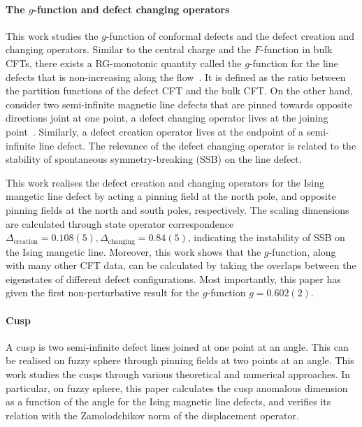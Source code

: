 \documentclass{timesjhep}
\begin{document}
\paragraph{The $g$-function and defect changing operators~\cite{Zhou2024Jan}}

This work studies the $g$-function of conformal defects and the defect creation and changing operators. Similar to the central charge and the $F$-function in bulk CFTs, there exists a RG-monotonic quantity called the $g$-function for the line defects that is non-increasing along the flow~\cite{Cuomo2021gfn,Casini2022gfn}. It is defined as the ratio between the partition functions of the defect CFT and the bulk CFT. On the other hand, consider two semi-infinite magnetic line defects that are pinned towards opposite directions joint at one point, a defect changing operator lives at the joining point~\cite{Affleck1994DefCh,Affleck1996DefCh}. Similarly, a defect creation operator lives at the endpoint of a semi-infinite line defect. The relevance of the defect changing operator is related to the stability of spontaneous symmetry-breaking (SSB) on the line defect. 

This work realises the defect creation and changing operators for the Ising mangetic line defect by acting a pinning field at the north pole, and opposite pinning fields at the north and south poles, respectively. The scaling dimensions are calculated through state operator correspondence $\Delta_{\mathrm{creation}}=0.108(5),\Delta_{\mathrm{changing}}=0.84(5)$, indicating the instability of SSB on the Ising mangetic line. Moreover, this work shows that the $g$-function, along with many other CFT data, can be calculated by taking the overlaps between the eigenstates of different defect configurations. Most importantly, this paper has given the first non-perturbative result for the $g$-function $g=0.602(2)$. 

\paragraph{Cusp~\cite{Cuomo2024}}

A cusp is two semi-infinite defect lines joined at one point at an angle. This can be realised on fuzzy sphere through pinning fields at two points at an angle. This work studies the cusps through various theoretical and numerical approaches. In particular, on fuzzy sphere, this paper calculates the cusp anomalous dimension as a function of the angle for the Ising magnetic line defects, and verifies its relation with the Zamolodchikov norm of the displacement operator. 
\end{document}
